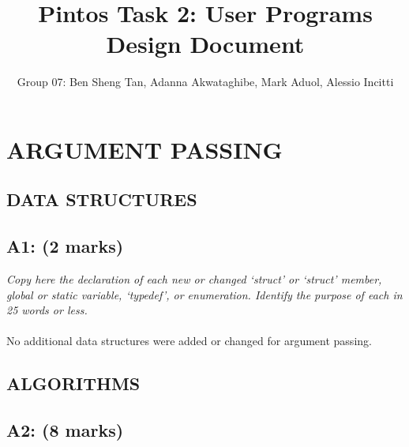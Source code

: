 \documentclass{article}
\title{Pintos Task 2: User Programs Design Document}
\author{Group 07: Ben Sheng Tan, Adanna Akwataghibe, Mark Aduol, Alessio Incitti }
\begin{document}
\maketitle

\section{ARGUMENT PASSING}

\subsection{ DATA STRUCTURES}

\subsection*{A1: (2 marks) }

\textit{Copy here the declaration of each new or changed ‘struct’ or ‘struct’ member, global or static variable, ‘typedef’, or enumeration. Identify the purpose of each in 25 words or less.}
\\ \\
No additional data structures were added or changed for argument passing.


\subsection{ALGORITHMS}

\subsection*{A2: (8 marks) }
\end{document}
